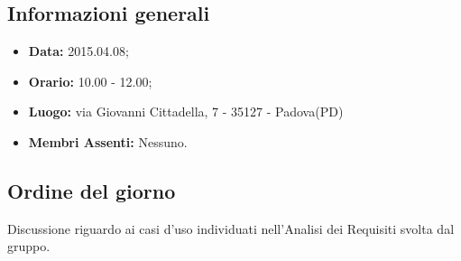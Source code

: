 \subsection{Informazioni generali}
\begin{itemize}
	\item \textbf{Data:} 2015.04.08;
	\item \textbf{Orario:} 10.00 - 12.00;
	\item \textbf{Luogo:} via Giovanni Cittadella, 7 - 35127 - Padova(PD)
	\item \textbf{Membri Assenti:} Nessuno.
\end{itemize}

\subsection{Ordine del giorno}
Discussione riguardo ai casi d'uso individuati nell'Analisi dei Requisiti svolta dal gruppo.
